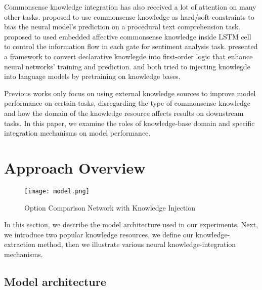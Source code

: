 \documentclass[11pt,a4paper]{article}
\begin{document}
Commonsense knowledge integration has also received a lot of attention on many other tasks. \citet{tandon-etal-2018-reasoning} proposed to use commonsense knowledge as hard/soft constraints to bias the neural model's prediction on a procedural text comprehension task. \citet{Ma2018TargetedAS} proposed to used embedded affective commonsense knowledge inside LSTM cell to control the information flow in each gate for sentiment analysis task.  \citet{li-srikumar-2019-augmenting} presented a framework to convert declarative knowlegde into first-order logic that enhance neural networks' training and prediction. \citet{Peters2019KnowledgeEC} and \citet{Levine2019SenseBERTDS} both tried to injecting knowlegde into language models by pretraining on knowledge bases. 

Previous works only focus on using external knowledge sources to improve model performance on certain tasks, disregarding the type of commonsense knowledge and how the domain of the knowledge resource affects results on downstream tasks. In this paper, we examine the roles of knowledge-base domain and specific integration mechanisms on model performance. 

\section{Approach Overview}
\begin{figure*}
    \centering
    \texttt{[image: model.png]}
    \caption{Option Comparison Network with Knowledge Injection}
    \label{fig:model}
\end{figure*}

In this section, we describe the model architecture used in our experiments. Next, we introduce two popular knowledge resources, we define our knowledge-extraction method, then we illustrate various neural knowledge-integration mechanisms.


\subsection{Model architecture}
\end{document}
